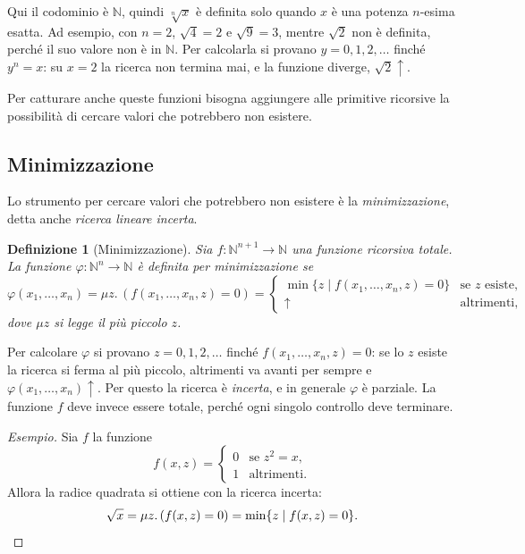\documentclass[a4paper, 11pt, oneside]{book}
\theoremstyle{formale}
\newtheorem*{definition}{Definizione}
\newenvironment{esempio}
    {\begin{proof}[\textit{Esempio}]\renewcommand{\qedsymbol}{$\diamond$}}
    {\end{proof}}
\begin{document}
    Qui il codominio \`e $\mathbb{N}$, quindi $\sqrt[n]{x}$ \`e definita solo quando $x$
    \`e una potenza $n$-esima esatta. Ad esempio, con $n = 2$, $\sqrt{4} = 2$ e
    $\sqrt{9} = 3$, mentre $\sqrt{2}$ non \`e definita, perch\'e il suo valore non \`e
    in $\mathbb{N}$. Per calcolarla si provano $y = 0, 1, 2, \dots$ finch\'e $y^n = x$:
    su $x = 2$ la ricerca non termina mai, e la funzione diverge, $\sqrt{2}\uparrow$.

    Per catturare anche queste funzioni bisogna aggiungere alle primitive ricorsive la
    possibilit\`a di cercare valori che potrebbero non esistere.

    \subsection{Minimizzazione}
    \label{sec:minimizzazione}
    Lo strumento per cercare valori che potrebbero non esistere \`e la
    \emph{minimizzazione}, detta anche \emph{ricerca lineare incerta}.

    \begin{definition}[Minimizzazione]
        Sia $f \colon \mathbb{N}^{n+1} \to \mathbb{N}$ una funzione ricorsiva totale. La
        funzione $\varphi \colon \mathbb{N}^n \to \mathbb{N}$ \`e \emph{definita per
        minimizzazione} se
        \begin{equation*}
            \varphi(x_1, \dots, x_n) = \mu z.\, (f(x_1, \dots, x_n, z) = 0) =
            \begin{cases}
                \min \{z \mid f(x_1, \dots, x_n, z) = 0\} & \text{se $z$ esiste}, \\
                \uparrow & \text{altrimenti},
            \end{cases}
        \end{equation*}
        dove $\mu z$ si legge \emph{il pi\`u piccolo $z$}.
    \end{definition}

    Per calcolare $\varphi$ si provano $z = 0, 1, 2, \dots$ finch\'e
    $f(x_1, \dots, x_n, z) = 0$: se lo $z$ esiste la ricerca si ferma al pi\`u piccolo,
    altrimenti va avanti per sempre e $\varphi(x_1, \dots, x_n)\uparrow$. Per questo la
    ricerca \`e \emph{incerta}, e in generale $\varphi$ \`e parziale. La funzione $f$
    deve invece essere totale, perch\'e ogni singolo controllo deve terminare.

    \begin{esempio}
        Sia $f$ la funzione
        \begin{equation*}
            f(x, z) =
            \begin{cases}
                0 & \text{se } z^2 = x, \\
                1 & \text{altrimenti}.
            \end{cases}
        \end{equation*}
        Allora la radice quadrata si ottiene con la ricerca incerta:
        \begin{equation*}
            \sqrt{x} = \mu z.\, (f(x, z) = 0) = \min \{z \mid f(x, z) = 0\}.\qedhere
        \end{equation*}
    \end{esempio}
\end{document}
